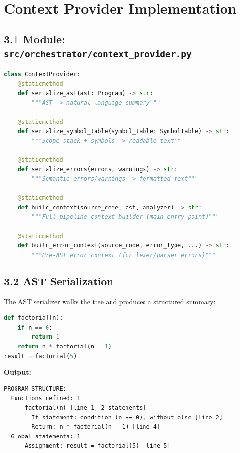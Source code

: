 \documentclass[a4paper,11pt]{article}
\begin{document}
    \section{Context Provider Implementation}

    \subsection{3.1 Module: \texttt{src/orchestrator/context\_provider.py}}

    \begin{lstlisting}[language=Python, caption=ContextProvider Class Overview]
class ContextProvider:
    @staticmethod
    def serialize_ast(ast: Program) -> str:
        """AST -> natural language summary"""

    @staticmethod
    def serialize_symbol_table(symbol_table: SymbolTable) -> str:
        """Scope stack + symbols -> readable text"""

    @staticmethod
    def serialize_errors(errors, warnings) -> str:
        """Semantic errors/warnings -> formatted text"""

    @staticmethod
    def build_context(source_code, ast, analyzer) -> str:
        """Full pipeline context builder (main entry point)"""

    @staticmethod
    def build_error_context(source_code, error_type, ...) -> str:
        """Pre-AST error context (for lexer/parser errors)"""
    \end{lstlisting}

    \subsection{3.2 AST Serialization}

    The AST serializer walks the tree and produces a structured summary:

    \begin{lstlisting}[language=Python, caption=AST Serialization Example Input]
def factorial(n):
    if n == 0:
        return 1
    return n * factorial(n - 1)
result = factorial(5)
    \end{lstlisting}

    \textbf{Output:}
    \begin{verbatim}
PROGRAM STRUCTURE:
  Functions defined: 1
    - factorial(n) [line 1, 2 statements]
      - If statement: condition (n == 0), without else [line 2]
      - Return: n * factorial(n - 1) [line 4]
  Global statements: 1
    - Assignment: result = factorial(5) [line 5]
    \end{verbatim}
\end{document}

